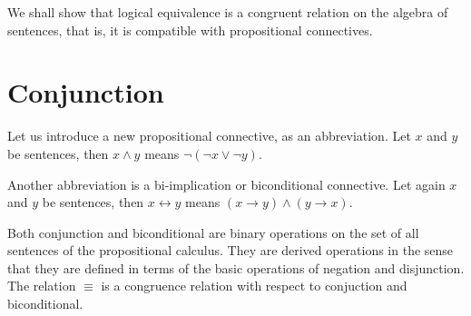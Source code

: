 \documentclass[letterpaper, 10pt]{article}
\theoremstyle{definition}
\renewcommand{\implies}{\rightarrow}
\newcommand{\bicond}{\leftrightarrow}
\begin{document}
We shall show that logical equivalence is a congruent relation on the algebra of
sentences, that is, it is compatible with propositional connectives.

\section{Conjunction}

Let us introduce a new propositional connective, as an abbreviation. Let $x$ and
$y$ be sentences, then $x \land y$ means $\neg(\neg x \lor \neg y)$.

Another abbreviation is a bi-implication or biconditional connective. 
Let again $x$ and $y$ be sentences, then $x \bicond y$ means $(x \implies
y)\land (y\implies x)$.

Both conjunction and biconditional are binary operations on the set of all
sentences of the propositional calculus. They are derived operations in the
sense that they are defined in terms of the basic operations of negation and
disjunction. The relation $\equiv$ is a congruence relation with respect to
conjuction and biconditional.
\end{document}
